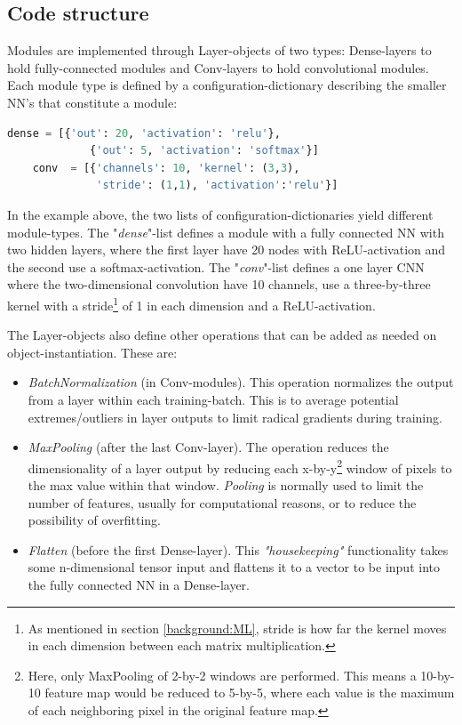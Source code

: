 \subsection{Code structure}
Modules are implemented through Layer-objects of two types: Dense-layers to hold fully-connected modules and Conv-layers to hold convolutional modules. Each module type is defined by a configuration-dictionary describing the smaller NN's that constitute a module: 

\begin{lstlisting}[language=Python]
    dense = [{'out': 20, 'activation': 'relu'}, 
             {'out': 5, 'activation': 'softmax'}]
    conv  = [{'channels': 10, 'kernel': (3,3), 
              'stride': (1,1), 'activation':'relu'}]
\end{lstlisting}
In the example above, the two lists of configuration-dictionaries yield different module-types. The "\emph{dense}"-list defines a module with a fully connected NN with two hidden layers, where the first layer have 20 nodes with ReLU-activation and the second use a softmax-activation. The "\emph{conv}"-list defines a one layer CNN where the two-dimensional convolution have 10 channels, use a three-by-three kernel with a stride\footnote{As mentioned in section \ref{background:ML}, stride is how far the kernel moves in each dimension between each matrix multiplication.} of 1 in each dimension and a ReLU-activation.

The Layer-objects also define other operations that can be added as needed on object-instantiation. These are:
\begin{itemize}
    \item \emph{BatchNormalization}\cite{batchnorm} (in Conv-modules). This operation normalizes the output from a layer within each training-batch. This is to average potential extremes/outliers in layer outputs to limit radical gradients during training.
    \item \emph{MaxPooling} (after the last Conv-layer). The operation reduces the dimensionality of a layer output by reducing each x-by-y\footnote{Here, only MaxPooling of 2-by-2 windows are performed. This means a 10-by-10 feature map would be reduced to 5-by-5, where each value is the maximum of each neighboring pixel in the original feature map.} window of pixels to the max value within that window. \emph{Pooling} is normally used to limit the number of features, usually for computational reasons, or to reduce the possibility of overfitting.
    \item \emph{Flatten} (before the first Dense-layer). This \textit{"housekeeping"} functionality takes some n-dimensional tensor input and flattens it to a vector to be input into the fully connected NN in a Dense-layer.  
\end{itemize}


